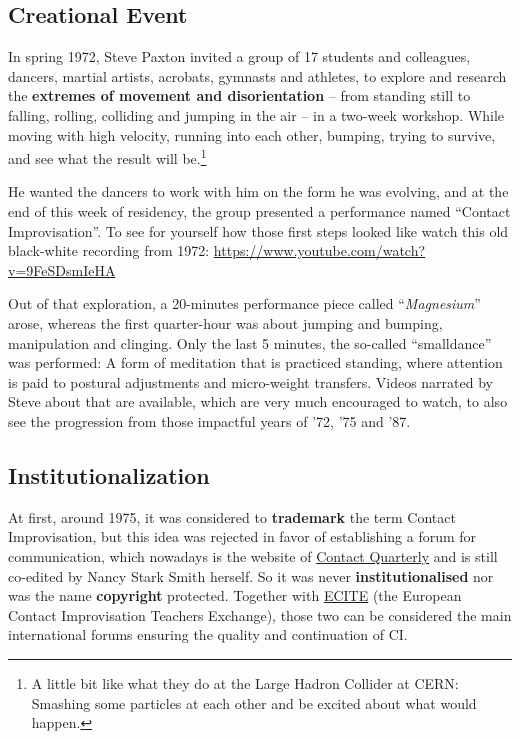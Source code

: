 \subsection{Creational Event}\label{subsec:creational-event}

In spring 1972, Steve Paxton invited a group of 17 students and colleagues, dancers, martial artists, acrobats, gymnasts and athletes, to explore and research the \textbf{extremes of movement and disorientation} -- from standing still to falling, rolling, colliding and jumping in the air -- in a two-week workshop.
While moving with high velocity, running into each other, bumping, trying to survive, and see what the result will be.\footnote{A little bit like what they do at the Large Hadron Collider at CERN: Smashing some particles at each other and be excited about what would happen.}

He wanted the dancers to work with him on the form he was evolving, and at the end of this week of residency, the group presented a performance named ``Contact Improvisation''.
To see for yourself how those first steps looked like watch this old black-white recording from 1972: \url{https://www.youtube.com/watch?v=9FeSDsmIeHA}

Out of that exploration, a 20-minutes performance piece called ``\textit{Magnesium}'' arose, whereas the first quarter-hour was about jumping and bumping, manipulation and clinging.
Only the last 5 minutes, the so-called ``\gls{smalldance}'' was performed: A form of meditation that is practiced standing, where attention is paid to postural adjustments and micro-weight transfers.
Videos narrated by Steve about that are available, which are very much encouraged to watch, to also see the progression from those impactful years of '72, '75 and '87.

\subsection{Institutionalization}\label{subsec:institutionalization}

At first, around 1975, it was considered to \textbf{trademark} the term Contact Improvisation, but this idea was rejected in favor of establishing a forum for communication, which nowadays is the website of \href{https://contactquarterly.com}{Contact Quarterly} and is still co-edited by Nancy Stark Smith herself.
So it was never \textbf{institutionalised} nor was the name \textbf{copyright} protected.
Together with \href{http://www.ecite.org}{ECITE} (the European Contact Improvisation Teachers Exchange), those two can be considered the main international forums ensuring the quality and continuation of CI\@.

